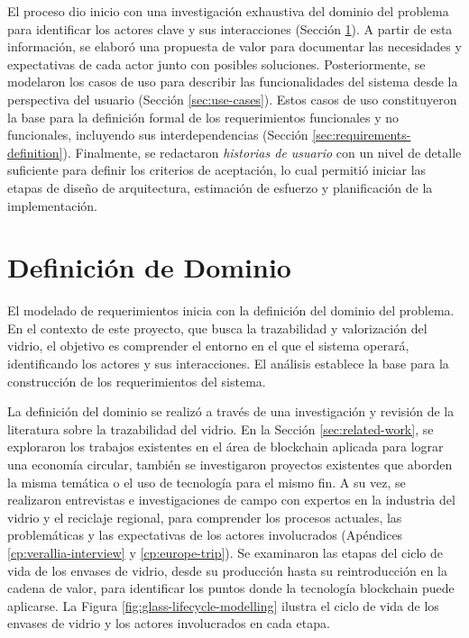 El proceso dio inicio con una investigación exhaustiva del dominio del problema para identificar los actores clave y sus interacciones (Sección \ref{sec:domain-definition}). A partir de esta información, se elaboró una propuesta de valor para documentar las necesidades y expectativas de cada actor junto con posibles soluciones. Posteriormente, se modelaron los casos de uso para describir las funcionalidades del sistema desde la perspectiva del usuario (Sección \ref{sec:use-cases}). Estos casos de uso constituyeron la base para la definición formal de los requerimientos funcionales y no funcionales, incluyendo sus interdependencias (Sección \ref{sec:requirements-definition}). Finalmente, se redactaron \textit{historias de usuario} con un nivel de detalle suficiente para definir los criterios de aceptación, lo cual permitió iniciar las etapas de diseño de arquitectura, estimación de esfuerzo y planificación de la implementación.

\section{Definición de Dominio}
\label{sec:domain-definition}

El modelado de requerimientos inicia con la definición del dominio del problema. En el contexto de este proyecto, que busca la trazabilidad y valorización del vidrio, el objetivo es comprender el entorno en el que el sistema operará, identificando los actores y sus interacciones. El análisis establece la base para la construcción de los requerimientos del sistema.

La definición del dominio se realizó a través de una investigación y revisión de la literatura sobre la trazabilidad del vidrio. En la Sección \ref{sec:related-work}, se exploraron los trabajos existentes en el área de blockchain aplicada para lograr una economía circular, también se investigaron proyectos existentes que aborden la misma temática o el uso de tecnología para el mismo fin. A su vez, se realizaron entrevistas e investigaciones de campo con expertos en la industria del vidrio y el reciclaje regional, para comprender los procesos actuales, las problemáticas y las expectativas de los actores involucrados (Apéndices \ref{cp:verallia-interview} y \ref{cp:europe-trip}). Se examinaron las etapas del ciclo de vida de los envases de vidrio, desde su producción hasta su reintroducción en la cadena de valor, para identificar los puntos donde la tecnología blockchain puede aplicarse. La Figura \ref{fig:glass-lifecycle-modelling} ilustra el ciclo de vida de los envases de vidrio y los actores involucrados en cada etapa.

